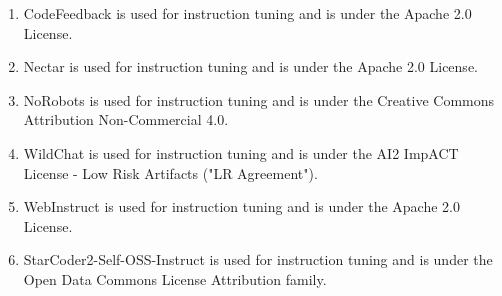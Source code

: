 \documentclass{article}
\begin{document}
\begin{enumerate}
    \item CodeFeedback \citep{zheng2024opencodeinterpreter} is used for instruction tuning and is under the Apache 2.0 License.
    \item Nectar \citep{starling2023} is used for instruction tuning and is under the Apache 2.0 License.
    \item NoRobots \citep{no_robots} is used for instruction tuning and is under the Creative Commons Attribution Non-Commercial 4.0.
    \item WildChat \citep{zhao2024wildchat} is used for instruction tuning and is under the AI2 ImpACT License - Low Risk Artifacts ("LR Agreement").
    \item WebInstruct \citep{yue2024mammoth2} is used for instruction tuning and is under the Apache 2.0 License.
    \item StarCoder2-Self-OSS-Instruct \citep{starcoder2instruct} is used for instruction tuning and is under the Open Data Commons License Attribution family.
\end{enumerate}
\end{document}
